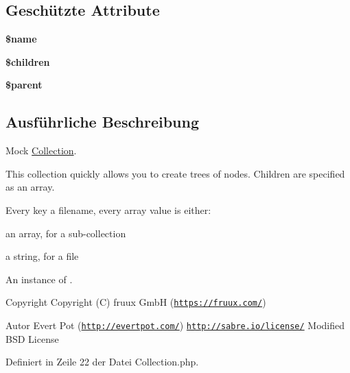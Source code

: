 \subsection*{Geschützte Attribute}
\begin{DoxyCompactItemize}
\item 
\mbox{\label{class_sabre_1_1_d_a_v_1_1_mock_1_1_collection_a25941c043967fad316c33cec38567636}} 
{\bfseries \$name}
\item 
\mbox{\label{class_sabre_1_1_d_a_v_1_1_mock_1_1_collection_a03dd37b3a1f45bcae66d523f6d67ba0a}} 
{\bfseries \$children}
\item 
\mbox{\label{class_sabre_1_1_d_a_v_1_1_mock_1_1_collection_a7f3e346e64d49989fbb194f00aa22f1b}} 
{\bfseries \$parent}
\end{DoxyCompactItemize}


\subsection{Ausführliche Beschreibung}
Mock \mbox{\hyperlink{class_sabre_1_1_d_a_v_1_1_mock_1_1_collection}{Collection}}.

This collection quickly allows you to create trees of nodes. Children are specified as an array.

Every key a filename, every array value is either\+:
\begin{DoxyItemize}
\item an array, for a sub-\/collection
\item a string, for a file
\item An instance of .
\end{DoxyItemize}

\begin{DoxyCopyright}{Copyright}
Copyright (C) fruux GmbH (\href{https://fruux.com/}{\tt https\+://fruux.\+com/}) 
\end{DoxyCopyright}
\begin{DoxyAuthor}{Autor}
Evert Pot (\href{http://evertpot.com/}{\tt http\+://evertpot.\+com/})  \href{http://sabre.io/license/}{\tt http\+://sabre.\+io/license/} Modified B\+SD License 
\end{DoxyAuthor}


Definiert in Zeile 22 der Datei Collection.\+php.



